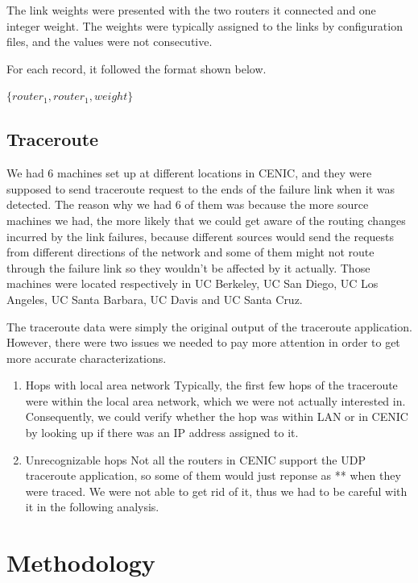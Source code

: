 \documentclass[conference, twocolumn, oneside, 10pt]{IEEEtran}
\begin{document}
The link weights were presented with the two routers it connected and one integer weight. The weights were typically assigned to the links by configuration files, and the values were not consecutive.

For each record, it followed the format shown below.

$\{router_1, router_1, weight\}$

\subsection{Traceroute}

We had 6 machines set up at different locations in CENIC, and they were supposed to send traceroute request to the ends of the failure link when it was detected. The reason why we had 6 of them was because the more source machines we had, the more likely that we could get aware of the routing changes incurred by the link failures, because different sources would send the requests from different directions of the network and some of them might not route through the failure link so they wouldn't be affected by it actually. Those machines were located respectively in UC Berkeley, UC San Diego, UC Los Angeles, UC Santa Barbara, UC Davis and UC Santa Cruz.

The traceroute data were simply the original output of the traceroute application. However, there were two issues we needed to pay more attention in order to get more accurate characterizations.

\begin{enumerate}

\item{Hops with local area network} Typically, the first few hops of the traceroute were within the local area network, which we were not actually interested in. Consequently, we could verify whether the hop was within LAN or in CENIC by looking up if there was an IP address assigned to it.

\item{Unrecognizable hops} Not all the routers in CENIC support the UDP traceroute application, so some of them would just reponse as ** when they were traced. We were not able to get rid of it, thus we had to be careful with it in the following analysis.

\end{enumerate}

\section{Methodology}
\label{sec:sec4}
\end{document}

